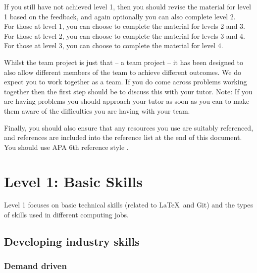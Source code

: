 \documentclass[a4paper, 11pt]{report}
\begin{document}
\begin{itemize}
    If you still have not achieved level 1, then you should revise the material for level 1 based on the feedback, and again optionally you can also complete level 2.\\
    For those at level 1, you can choose to complete the material for levels 2 and 3.\\
    For those at level 2, you can choose to complete the material for levels 3 and 4.\\
    For those at level 3, you can choose to complete the material for level 4.
\end{itemize}

Whilst the team project is just that -- a team project -- it has been designed to also allow different members of the team to achieve different outcomes. We do expect you to work together as a team. If you do come across problems working together then the first step should be to discuss this with your tutor. Note: If you are having problems you should approach your tutor as soon as you can to make them aware of the difficulties you are having with your team.

Finally, you should also ensure that any resources you use are suitably referenced, and references are included into the reference list at the end of this document. You should use APA 6th reference style \cite{apa6}.


\newpage
\section{Level 1: Basic Skills}

Level 1 focuses on basic technical skills (related to \LaTeX\ and Git) and the types of skills used in different computing jobs.

\subsection{Developing industry skills}

\subsubsection{Demand driven}
\end{document}
